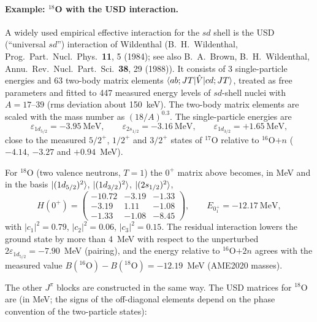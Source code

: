 \documentclass[11pt,a4paper]{article}
\newcommand{\op}[1]{\hat{#1}}
\begin{document}
\paragraph{Example: ${}^{18}$O with the USD interaction.}
A widely used empirical effective interaction for the $sd$ shell is the USD (``universal $sd$'') interaction of Wildenthal (B.~H.~Wildenthal, Prog.\ Part.\ Nucl.\ Phys.\ \textbf{11}, 5 (1984); see also B.~A.~Brown, B.~H.~Wildenthal, Annu.\ Rev.\ Nucl.\ Part.\ Sci.\ \textbf{38}, 29 (1988)). It consists of 3 single-particle energies and 63 two-body matrix elements $\braket{ab;JT|\op V|cd;JT}$, treated as free parameters and fitted to 447 measured energy levels of $sd$-shell nuclei with $A=17$--$39$ (rms deviation about 150~keV). The two-body matrix elements are scaled with the mass number as $(18/A)^{0.3}$. The single-particle energies are
\[
\varepsilon_{1d_{5/2}}=-3.95~\text{MeV},\qquad
\varepsilon_{2s_{1/2}}=-3.16~\text{MeV},\qquad
\varepsilon_{1d_{3/2}}=+1.65~\text{MeV},
\]
close to the measured $5/2^+$, $1/2^+$ and $3/2^+$ states of ${}^{17}$O relative to ${}^{16}$O$+n$ ($-4.14$, $-3.27$ and $+0.94$~MeV).

For ${}^{18}$O (two valence neutrons, $T=1$) the $0^+$ matrix above becomes, in MeV and in the basis $\ket{(1d_{5/2})^2}$, $\ket{(1d_{3/2})^2}$, $\ket{(2s_{1/2})^2}$,
\[
H(0^+)=
\begin{pmatrix}
-10.72 & -3.19 & -1.33\\
-3.19 & 1.11 & -1.08\\
-1.33 & -1.08 & -8.45
\end{pmatrix},
\qquad E_{0^+_1}=-12.17~\text{MeV},
\]
with $|c_1|^2=0.79$, $|c_2|^2=0.06$, $|c_3|^2=0.15$. The residual interaction lowers the ground state by more than 4~MeV with respect to the unperturbed $2\varepsilon_{1d_{5/2}}=-7.90$~MeV (pairing), and the energy relative to ${}^{16}$O$+2n$ agrees with the measured value $B({}^{16}\mathrm{O})-B({}^{18}\mathrm{O})=-12.19$~MeV (AME2020 masses).

The other $J^\pi$ blocks are constructed in the same way. The USD matrices for ${}^{18}$O are (in MeV; the signs of the off-diagonal elements depend on the phase convention of the two-particle states):
\end{document}
